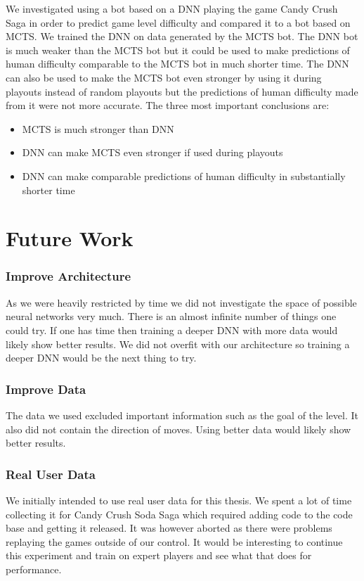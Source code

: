 \documentclass{kththesis}
\begin{document}
We investigated using a bot based on a DNN playing the game Candy Crush Saga in order to predict game level difficulty and compared it to a bot based on MCTS. We trained the DNN on data generated by the MCTS bot. The DNN bot is much weaker than the MCTS bot but it could be used to make predictions of human difficulty comparable to the MCTS bot in much shorter time. The DNN can also be used to make the MCTS bot even stronger by using it during playouts instead of random playouts but the predictions of human difficulty made from it were not more accurate. The three most important conclusions are:
\begin{itemize}
\item  MCTS is much stronger than DNN
\item  DNN can make MCTS even stronger if used during playouts
\item DNN can make comparable predictions of human difficulty in substantially shorter time
\end{itemize}


\section{Future Work}
\subsubsection{Improve Architecture}
As we were heavily restricted by time  we did not investigate the space of possible neural networks very much. There is an almost infinite number of things one could try. If one has time then training a deeper DNN with more data would likely show better results. We did not overfit with our architecture so training a deeper DNN would be the next thing to try.

\subsubsection{Improve Data}
The data we used excluded important information such as the goal of the level. It also did not contain the direction of moves. Using better data would likely show better results.

\subsubsection{Real User Data}
We initially intended to use real user data for this thesis. We spent a lot of time collecting  it for Candy Crush Soda Saga which required adding code to the code base and getting it released.  It was however aborted as there were problems replaying the games outside of our control. It would be interesting to continue this experiment and train on expert players and see what that does for performance.
\end{document}
